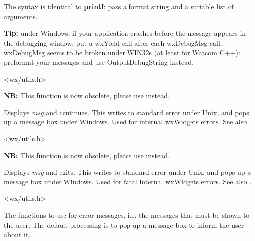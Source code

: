 The syntax is identical to {\bf printf}: pass a format string and a
variable list of arguments.

{\bf Tip:} under Windows, if your application crashes before the
message appears in the debugging window, put a wxYield call after
each wxDebugMsg call. wxDebugMsg seems to be broken under WIN32s
(at least for Watcom C++): preformat your messages and use OutputDebugString
instead.


<wx/utils.h>


\label{wxerror}


{\bf NB:} This function is now obsolete, please use 
instead.

Displays {\it msg} and continues. This writes to standard error under
Unix, and pops up a message box under Windows. Used for internal
wxWidgets errors. See also .


<wx/utils.h>


\label{wxfatalerror}


{\bf NB:} This function is now obsolete, please use
 instead.

Displays {\it msg} and exits. This writes to standard error under Unix,
and pops up a message box under Windows. Used for fatal internal
wxWidgets errors. See also .


<wx/utils.h>


\label{wxlogerror}



The functions to use for error messages, i.e. the messages that must be shown
to the user. The default processing is to pop up a message box to inform the
user about it.


